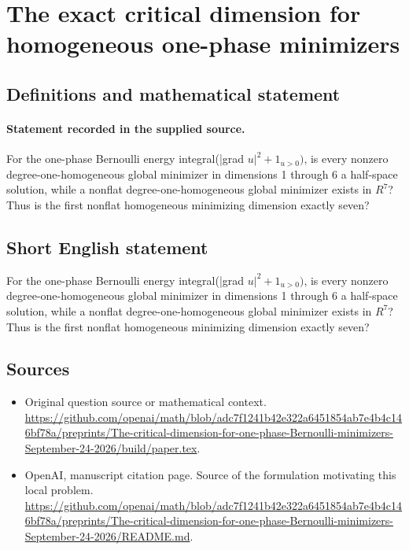 \documentclass[11pt]{article}
\begin{document}
\section*{The exact critical dimension for homogeneous one-phase minimizers}\label{statement}
\subsection{Definitions and mathematical statement}
\paragraph{Statement recorded in the supplied source.}
For the one-phase Bernoulli energy integral(|grad $u|^2+1_{u>0})$, is every nonzero degree-one-homogeneous global minimizer in dimensions 1 through 6 a half-space solution, while a nonflat degree-one-homogeneous global minimizer exists in $R^7$? Thus is the first nonflat homogeneous minimizing dimension exactly seven?
\subsection{Short English statement}
For the one-phase Bernoulli energy integral(|grad $u|^2+1_{u>0})$, is every nonzero degree-one-homogeneous global minimizer in dimensions 1 through 6 a half-space solution, while a nonflat degree-one-homogeneous global minimizer exists in $R^7$? Thus is the first nonflat homogeneous minimizing dimension exactly seven?
\subsection{Sources}
\begin{itemize}
\item[S1] Original question source or mathematical context.
\url{https://github.com/openai/math/blob/adc7f1241b42e322a6451854ab7e4b4c146bf78a/preprints/The-critical-dimension-for-one-phase-Bernoulli-minimizers-September-24-2026/build/paper.tex}.
\item[S2] OpenAI, manuscript citation page. Source of the formulation motivating this local problem.
\url{https://github.com/openai/math/blob/adc7f1241b42e322a6451854ab7e4b4c146bf78a/preprints/The-critical-dimension-for-one-phase-Bernoulli-minimizers-September-24-2026/README.md}.
\end{itemize}
\end{document}
